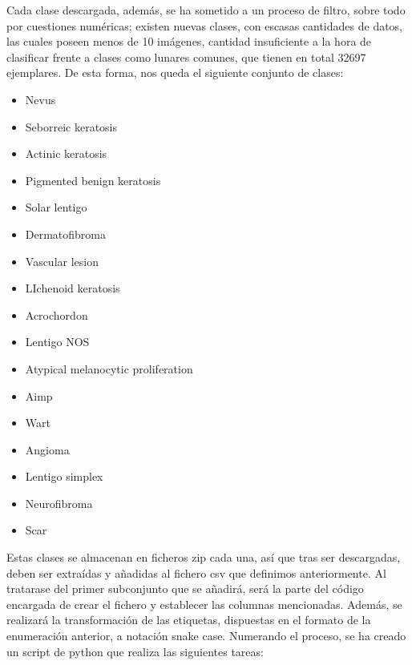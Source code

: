 Cada clase descargada, además, se ha sometido a un proceso de filtro, sobre todo por cuestiones numéricas; existen nuevas clases, con escasas cantidades de datos, las cuales poseen menos de 10 imágenes, cantidad insuficiente a la hora de clasificar frente a clases como lunares comunes, que tienen en total 32697 ejemplares. De esta forma, nos queda el siguiente conjunto de clases:
\begin{itemize}
	\item Nevus
	\item Seborreic keratosis            
	 \item Actinic keratosis            
	\item Pigmented benign keratosis         
	\item Solar lentigo                           
	\item Dermatofibroma                          
	\item Vascular lesion                         
	\item LIchenoid keratosis                     
	\item Acrochordon                             
	\item Lentigo NOS                             
	\item Atypical melanocytic proliferation       
	\item Aimp                                     
	\item 	Wart                                     
	\item Angioma                                  
	\item Lentigo simplex                          
	\item 	Neurofibroma                             
	 \item 	Scar 
\end{itemize}

Estas clases se almacenan en ficheros zip cada una, así que tras ser descargadas, deben ser extraídas y añadidas al fichero csv que definimos anteriormente. Al tratarase del primer subconjunto que se añadirá, será la parte del código encargada de crear el fichero y establecer las columnas mencionadas. Además, se realizará la transformación de las etiquetas, dispuestas en el formato de la enumeración anterior, a notación snake case. Numerando el proceso, se ha creado un script de python que realiza las siguientes tareas:

